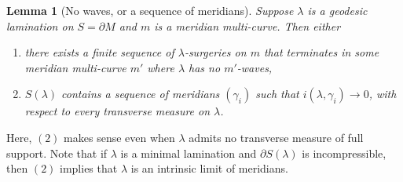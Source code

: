 \documentclass[12pt]{amsart}
\newtheorem{lemma}[theorem]{Lemma}
\theoremstyle{definition}
\theoremstyle{remark}
\begin{document}
\begin {lemma}[No waves, or a sequence of meridians]\label {tightcuts}
 Suppose $\lambda$  is a geodesic lamination on  $S=\partial M$  and $m$  is a meridian multi-curve. Then either 
\begin {enumerate}
\item there exists a finite sequence of $\lambda $-surgeries on $m$ that terminates in some meridian multi-curve $m'$ where $\lambda $ has no $m'$-waves,
\item  $S(\lambda)$ contains a sequence of meridians $(\gamma_i)$ such that $i(\lambda,\gamma_i) \to 0$,  with respect to every transverse measure on $\lambda $. \end{enumerate}
\end {lemma}

Here, $(2)$ makes sense even when $\lambda$  admits no transverse measure of full support. Note that if $\lambda $ is a minimal lamination and $\partial S(\lambda) $ is incompressible, then $(2)$  implies that  $\lambda $ is an  intrinsic limit of meridians. 
\end{document}
